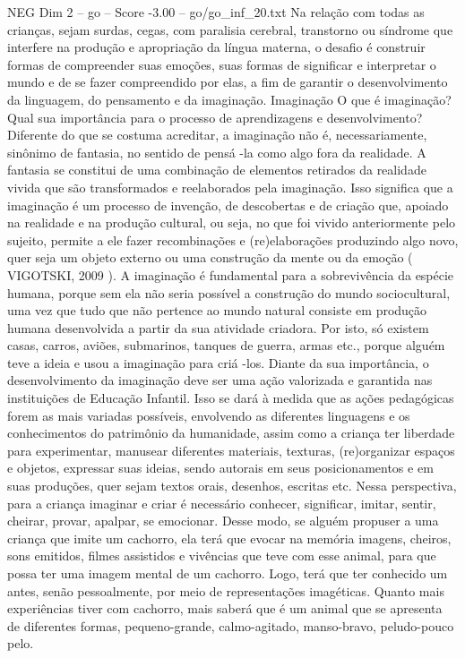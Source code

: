 \begin{textsample}{NEG Dim 2 – go – Score -3.00 – go/go\_inf\_20.txt}
Na relação com todas as crianças, sejam surdas, cegas, com paralisia cerebral, transtorno ou síndrome que interfere na produção e apropriação da língua materna, o desafio é construir formas de compreender suas emoções, suas formas de significar e interpretar o mundo e de se fazer compreendido por elas, a fim de garantir o desenvolvimento da linguagem, do pensamento e da imaginação.
Imaginação O que é imaginação?
Qual sua importância para o processo de aprendizagens e desenvolvimento?
Diferente do que se costuma acreditar, a imaginação não é, necessariamente, sinônimo de fantasia, no sentido de pensá -la como algo fora da realidade.
A fantasia se constitui de uma combinação de elementos retirados da realidade vivida que são transformados e reelaborados pela imaginação.
Isso significa que a imaginação é um processo de invenção, de descobertas e de criação que, apoiado na realidade e na produção cultural, ou seja, no que foi vivido anteriormente pelo sujeito, permite a ele fazer recombinações e (re)elaborações produzindo algo novo, quer seja um objeto externo ou uma construção da mente ou da emoção ( VIGOTSKI, 2009 ).
A imaginação é fundamental para a sobrevivência da espécie humana, porque sem ela não seria possível a construção do mundo sociocultural, uma vez que tudo que não pertence ao mundo natural consiste em produção humana desenvolvida a partir da sua atividade criadora.
Por isto, só existem casas, carros, aviões, submarinos, tanques de guerra, armas etc., porque alguém teve a ideia e usou a imaginação para criá -los.
Diante da sua importância, o desenvolvimento da imaginação deve ser uma ação valorizada e garantida nas instituições de Educação Infantil.
Isso se dará à medida que as ações pedagógicas forem as mais variadas possíveis, envolvendo as diferentes linguagens e os conhecimentos do patrimônio da humanidade, assim como a criança ter liberdade para experimentar, manusear diferentes materiais, texturas, (re)organizar espaços e objetos, expressar suas ideias, sendo autorais em seus posicionamentos e em suas produções, quer sejam textos orais, desenhos, escritas etc.
Nessa perspectiva, para a criança imaginar e criar é necessário conhecer, significar, imitar, sentir, cheirar, provar, apalpar, se emocionar.
Desse modo, se alguém propuser a uma criança que imite um cachorro, ela terá que evocar na memória imagens, cheiros, sons emitidos, filmes assistidos e vivências que teve com esse animal, para que possa ter uma imagem mental de um cachorro.
Logo, terá que ter conhecido um antes, senão pessoalmente, por meio de representações imagéticas.
Quanto mais experiências tiver com cachorro, mais saberá que é um animal que se apresenta de diferentes formas, pequeno-grande, calmo-agitado, manso-bravo, peludo-pouco pelo.

\end{textsample}
